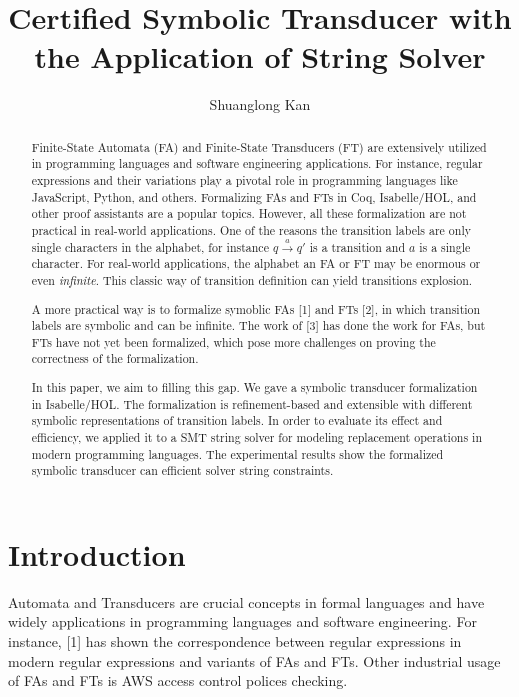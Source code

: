 \documentclass[a4paper,UKenglish,cleveref, autoref, thm-restate]{lipics-v2021}
\title{Certified Symbolic Transducer with the Application of String Solver} %
\author{Shuanglong Kan}{Barkhausen Institut, Germany \and \url{https://github.com/ShlKan} }{shuanglongkan@gmail.com}{https://orcid.org/0000-0002-1825-0097}{(Optional) author-specific funding acknowledgements}%
\begin{document}
\maketitle

\begin{abstract}
Finite-State Automata (FA) and Finite-State Transducers (FT) are extensively utilized in programming languages and software engineering applications. For instance, regular expressions and their variations play a pivotal role in programming languages like JavaScript, Python, and others. Formalizing FAs and FTs in Coq, Isabelle/HOL, and other proof assistants are a popular topics. However, all these formalization are not practical in real-world applications. 
One of the reasons the transition labels are only single characters in the alphabet, for instance $q\xrightarrow{a} q'$ is a transition and $a$ is a single character. For real-world applications, the alphabet an FA or FT may be enormous or even \emph{infinite}. This classic way of transition definition can yield transitions explosion. 

A more practical way is to formalize symoblic FAs [1] and FTs [2], in which transition labels are symbolic and can be infinite. The work of [3] has done the work for FAs, but FTs 
have not yet been formalized, which pose more challenges on proving the correctness of the formalization.

In this paper, we aim to filling this gap. We gave a symbolic transducer formalization in Isabelle/HOL. The formalization is refinement-based and extensible with different symbolic representations of transition labels. In order to evaluate its effect and efficiency, we applied it to a  SMT string solver for modeling replacement operations in modern programming languages. The experimental results show the formalized symbolic transducer can efficient solver string constraints.


\end{abstract}

\section{Introduction}
\label{sec:introduction}

Automata and Transducers are crucial concepts in formal languages and have widely applications in programming languages and software engineering. For instance, [1] has shown the correspondence between  regular expressions in modern regular expressions and variants of FAs and FTs. Other industrial usage of FAs and FTs is AWS access control polices checking.
\end{document}

